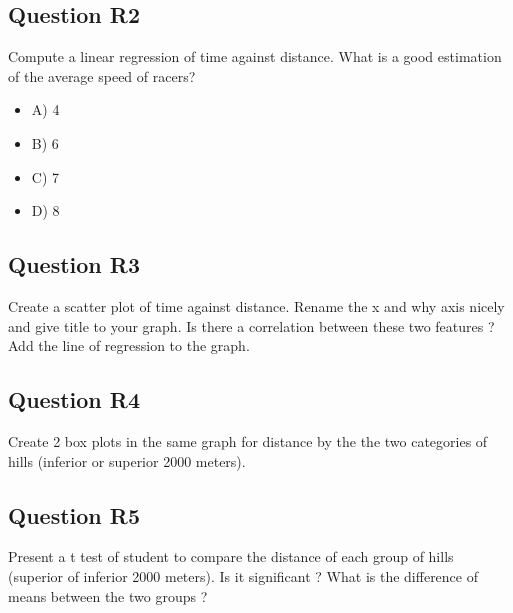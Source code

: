\documentclass[11pt]{article}
\begin{document}
\subsection*{Question R2}
\label{sec:orgff8fa9e}
Compute a linear regression of time against distance. What is a good estimation
of the average speed of racers?
\begin{itemize}
\item A) 4

\item B) 6

\item C) 7

\item D) 8
\end{itemize}

\subsection*{Question R3}
\label{sec:orgc900c75}
Create a scatter plot of time against distance. Rename the x and why axis nicely
and give title to your graph. Is there a correlation between these two features
? Add the line of regression to the graph.
\subsection*{Question R4}
\label{sec:orgbfafeff}
Create 2 box plots in the same graph for distance by the the two categories of hills (inferior or
superior 2000 meters).
\subsection*{Question R5}
\label{sec:org8a3c198}
Present a t test of student to compare the distance of each group of hills
(superior of inferior 2000 meters). Is it significant ? What is the difference
of means between the two groups ?
\end{document}
